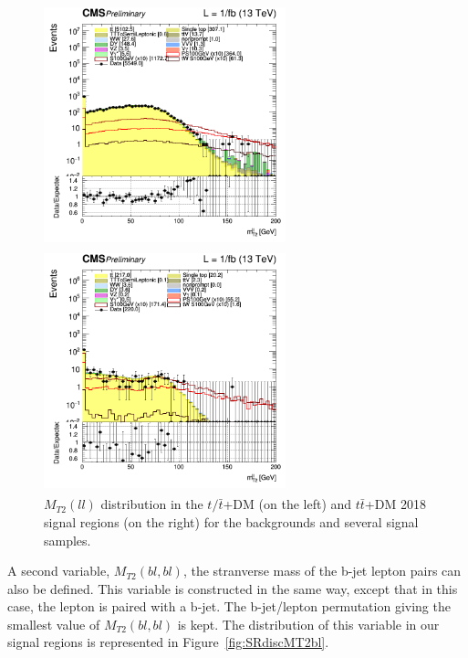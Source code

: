 \documentclass[a4paper, 10pt, openright]{report}
\begin{document}
\begin{figure}[htbp]
\centering
\begin{minipage}[b]{.48\textwidth}
\includegraphics[width=7cm, height=7cm]{figs/log_cratio_topCR_ll_2j_signal1_mt2ll.png}
\end{minipage}\hfill
\begin{minipage}[b]{.48\textwidth}
\includegraphics[width=7cm, height=7cm]{figs/log_cratio_topCR_ll_2j_signal0_mt2ll.png}
\end{minipage} \hfill
\caption{$M_{T2}(ll)$ distribution in the $t/ \bar t$+DM (on the left) and $t \bar t$+DM 2018 signal regions (on the right) for the backgrounds and several signal samples.}
\label{fig:SRdiscMT2}
\end{figure}

A second variable, $M_{T2}(bl, bl)$, the stranverse mass of the b-jet lepton pairs can also be defined. This variable is constructed in the same way, except that in this case, the lepton is paired with a b-jet. The b-jet/lepton permutation giving the smallest value of $M_{T2}(bl, bl)$ is kept. The distribution of this variable in our signal regions is represented in Figure~\ref{fig:SRdiscMT2bl}.
\end{document}
